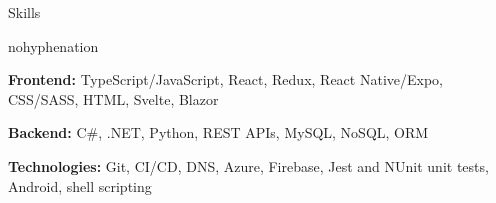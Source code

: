 \documentclass[
	10pt, %
]{article} %
\begin{document}
\printname

\begin{rSection}{Skills}
	\begin{hyphenrules}{nohyphenation}

		\begin{rSubsection}{}{}{}{}
			\item[] \textbf{Frontend:} TypeScript/JavaScript, React, Redux, React Native/Expo, CSS/SASS, HTML, Svelte, Blazor
			\item[] \textbf{Backend:} C\#, .NET, Python, REST APIs, MySQL, NoSQL, ORM
			\item[] \textbf{Technologies:} Git, CI/CD, DNS, Azure, Firebase, Jest and NUnit unit tests, Android, shell scripting
		\end{rSubsection}

	\end{hyphenrules}
\end{rSection}
\end{document}
